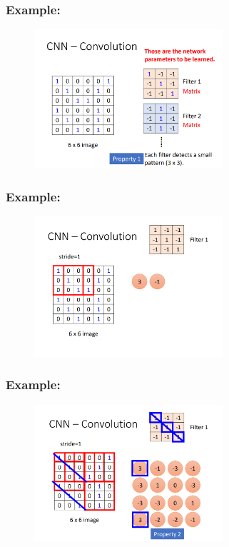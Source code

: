 \documentclass{beamer}
\begin{document}
    \begin{frame}
    \frametitle{Example: }
        \begin{figure}[H]
            \begin{center}
                \includegraphics[width=7cm]{ppt2}
            \end{center}
        \end{figure}
    \end{frame}
    \begin{frame}
    \frametitle{Example: }
        \begin{figure}[H]
            \begin{center}
                \includegraphics[width=7cm]{ppt3}
            \end{center}
        \end{figure}
    \end{frame}
    \begin{frame}
    \frametitle{Example: }
        \begin{figure}[H]
            \begin{center}
                \includegraphics[width=7cm]{ppt4}
            \end{center}
        \end{figure}
    \end{frame}
\end{document}
